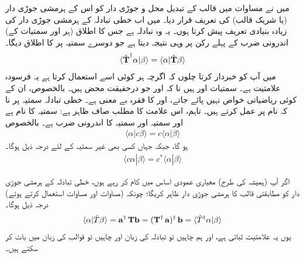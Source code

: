 میں نے مساوات  میں قالب کے تبدیل محل و جوڑی دار  کو اس کے   ہرمشی جوڑی دار  (یا شریک قالب) کی تعریف قرار دیا۔  میں اب  خطی تبادلہ کے ہرمشی جوڑی دار کی  زیادہ بنیادی تعریف پیش کرتا ہوں۔  یہ وہ تبادلہ  ہے جس کا اطلاق (ہر   اور  سمتیات کے)   اندرونی ضرب کے پہلے رکن پر وہی نتیجہ دیتا ہے جو دوسرے سمتیہ پر   کا اطلاق دیگا۔
\begin{align}
	\langle\hat{\operatorname{\mathbf{T}}}^{\dagger}\alpha|\beta\rangle = \langle\alpha|\hat{\operatorname{\mathbf{T}}}\beta\rangle
\end{align}
  میں آپ کو خبردار کرتا چلوں کہ اگرچہ ہر کوئی اسے استعمال کرتا ہے یہ فرسودہ علامتیت ہے۔ سمتیات   اور  ہیں نا کہ   اور  جو درحقیقت  محض  ہیں۔ بالخصوص،  ان کے کوئی ریاضیاتی خواص نہیں پائے جاتے،  اور   کا فقرہ بے معنی ہے۔ خطی تبادلہ  سمتیہ پر نا کہ نام پر عمل کرتے ہیں۔ تاہم،  اس علامت کا مطلب صاف ظاہر ہے: سمتیہ    کا نام     ہے اور سمتیہ  اور سمتیہ  کا اندرونی ضرب  ہے۔ بالخصوص
\begin{align}
	\langle\alpha| c\beta\rangle = c\langle\alpha|\beta\rangle
\end{align}
ہو گا، جبکہ  جہاں کسی بھی غیر سمتیہ  کے لئے درجہ ذیل ہوگا۔
\begin{align}
	\langle c\alpha|\beta\rangle = c^{*}\langle\alpha|\beta\rangle
\end{align}

اگر آپ (ہمیشہ کی طرح)  معیاری عمودی اساس میں کام کر رہے ہوں، خطی تبادلہ کے ہرمشی جوڑی دار کو مطابقتی قالب کا ہرمشی جوڑی دار ظاہر کریگا؛  چونکہ (مساوات  اور مساوات   استعمال کرتے ہوئے)  درجہ ذیل ہوگا۔
\begin{align}
	\langle\alpha|\hat{T}\beta\rangle = \operatorname{\mathbf{a}}^\dagger \operatorname{\mathbf{Tb}} = (\operatorname{\mathbf{T}}^\dagger \operatorname{\mathbf{a}})^\dagger \operatorname{\mathbf{b}} = \langle\hat{T}^\dagger\alpha|\beta\rangle
\end{align}
یوں یہ علامتیت ثباتی  ہے،  اور ہم چاہیں تو تبادلہ کی زبان اور چاہیں تو قوالب کی زبان میں بات کر سکتے ہیں۔

